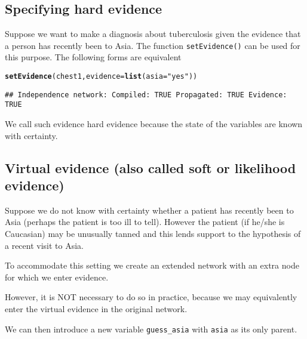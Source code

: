 \documentclass[10pt]{article}\usepackage[]{graphicx}\usepackage[]{xcolor}
\makeatletter
\newcommand{\hlstr}[1]{\textcolor[rgb]{0.192,0.494,0.8}{#1}}%
\newcommand{\hlstd}[1]{\textcolor[rgb]{0.345,0.345,0.345}{#1}}%
\newcommand{\hlkwc}[1]{\textcolor[rgb]{0.333,0.667,0.333}{#1}}%
\newcommand{\hlkwd}[1]{\textcolor[rgb]{0.737,0.353,0.396}{\textbf{#1}}}%
\newenvironment{kframe}{%
 \def\at@end@of@kframe{}%
 \ifinner\ifhmode%
  \def\at@end@of@kframe{\end{minipage}}%
  \begin{minipage}{\columnwidth}%
 \fi\fi%
 \def\FrameCommand##1{\hskip\@totalleftmargin \hskip-\fboxsep
 \colorbox{shadecolor}{##1}\hskip-\fboxsep
     \hskip-\linewidth \hskip-\@totalleftmargin \hskip\columnwidth}%
 \MakeFramed {\advance\hsize-\width
   \@totalleftmargin\z@ \linewidth\hsize
   \@setminipage}}%
 {\par\unskip\endMakeFramed%
 \at@end@of@kframe}
\newenvironment{knitrout}{}{} %
\def\code#1{{\texttt{#1}}}
\makeatother
\begin{document}
\subsection{Specifying hard evidence} 
\label{sec:hard-evidence}

Suppose we want to make a diagnosis about tuberculosis given the evidence that a person has recently been to Asia.
The function \code{setEvidence()} can  be used for this purpose. The following forms are equivalent

\begin{knitrout}
\color{fgcolor}\begin{kframe}
\begin{alltt}
\hlkwd{setEvidence}\hlstd{(chest1,} \hlkwc{evidence}\hlstd{=}\hlkwd{list}\hlstd{(}\hlkwc{asia}\hlstd{=}\hlstr{"yes"}\hlstd{))}
\end{alltt}
\begin{verbatim}
## Independence network: Compiled: TRUE Propagated: TRUE Evidence: TRUE
\end{verbatim}
\end{kframe}
\end{knitrout}

We call such evidence hard evidence because the state of the variables are known with certainty.



\subsection{Virtual evidence (also called soft or likelihood evidence)}
\label{sec:virt-evid-likel}

Suppose we do not know with certainty whether a patient has
recently been to Asia (perhaps the patient is too ill to
tell). However the patient (if he/she is Caucasian) may be unusually
tanned and this lends support to the hypothesis of a recent visit to
Asia.

To accommodate this setting we create an extended network with an extra
node for which we enter evidence.


However, it is NOT necessary to do
so in practice, because we may equivalently enter the virtual evidence
in the original network.

We can then introduce a new variable
\code{guess\_asia} with \code{asia} as its only parent.
\end{document}
